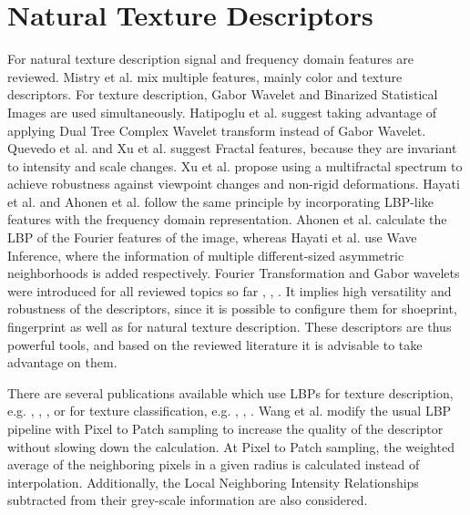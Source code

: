 \documentclass[draft,final]{vutinfth} %
\begin{document}
\section*{Natural Texture Descriptors}
\par
For natural texture description signal and frequency domain features are reviewed.
Mistry et al. \cite{mistry2017content}  mix multiple features, mainly color and texture descriptors.
For texture description, Gabor Wavelet and Binarized Statistical Images  \cite{kannala2012bsif} are used simultaneously.
Hatipoglu et al. \cite{hatipoglu2000image} suggest taking advantage of  applying Dual Tree Complex Wavelet transform instead of Gabor Wavelet.
Quevedo et al. \cite{quevedo2002description} and Xu et al. \cite{xu2009viewpoint} suggest Fractal features, because they are invariant to intensity and scale changes.
Xu et al. \cite{xu2009viewpoint} propose using a multifractal spectrum to achieve robustness against viewpoint changes and non-rigid deformations.
Hayati et al. \cite{hayati2018wirif} and Ahonen et al. \cite{ahonen2009rotation} follow the same principle by incorporating LBP-like features with the frequency domain representation.
Ahonen et al. \cite{ahonen2009rotation} calculate the LBP of the Fourier features of the image, whereas Hayati et al. \cite{hayati2018wirif} use Wave Inference, where the information of multiple different-sized asymmetric neighborhoods is added respectively.
Fourier Transformation and Gabor wavelets were introduced for all reviewed topics so far \cite{kortylewski2014unsupervised}, \cite{wu2019crime}, \cite{bolle2012fingerprint}.
It implies high versatility and robustness of the descriptors, since it is possible to configure them for shoeprint, fingerprint as well as for natural texture description.  
These descriptors are thus powerful tools, and based on the reviewed literature it is advisable to take advantage on them.
\par
There are several publications available which use LBPs for texture description, e.g. \cite{guo2012discriminative}, \cite{hong2014combining}, \cite{ahonen2009rotation}, or for texture classification, e.g. \cite{khellah2011texture}, \cite{guo2010rotation}, \cite{zhang2017learning}.
Wang et al. \cite{wang2013pixel} modify the usual LBP pipeline with Pixel to Patch sampling to increase the quality of the descriptor without slowing down the calculation.
At Pixel to Patch sampling, the weighted average of the neighboring pixels in a given radius is calculated instead of interpolation.
Additionally, the Local Neighboring Intensity Relationships subtracted from their grey-scale information are also considered.
\end{document}
